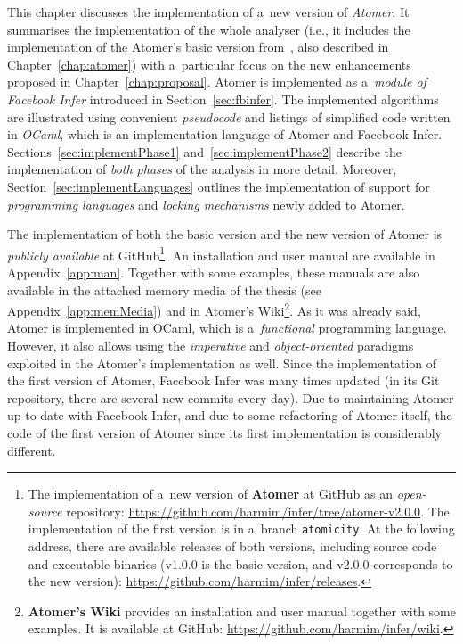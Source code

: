 This chapter discusses the implementation of a~new version of \emph{Atomer}. It summarises the implementation of the whole analyser (i.e., it includes the implementation of the Atomer's basic version from~\cite{harmimBP}, also described in Chapter~\ref{chap:atomer}) with a~particular focus on the new enhancements proposed in Chapter~\ref{chap:proposal}. Atomer is implemented as a~\emph{module of Facebook Infer} introduced in Section~\ref{sec:fbinfer}. The implemented algorithms are illustrated using convenient \emph{pseudocode} and listings of simplified code written in \emph{OCaml}, which is an implementation language of Atomer and Facebook Infer. Sections~\ref{sec:implementPhase1} and~\ref{sec:implementPhase2} describe the implementation of \emph{both phases} of the analysis in more detail. Moreover, Section~\ref{sec:implementLanguages} outlines the implementation of support for \emph{programming languages} and \emph{locking mechanisms} newly added to Atomer.

The implementation of both the basic version and the new version of Atomer is \emph{publicly available} at GitHub\footnote{The implementation of a~new version of \textbf{Atomer} at GitHub as an \emph{open-source} repository: \url{https://github.com/harmim/infer/tree/atomer-v2.0.0}. The implementation of the first version is in a~branch \texttt{atomicity}. At the following address, there are available releases of both versions, including source code and executable binaries (v1.0.0 is the basic version, and v2.0.0 corresponds to the new version): \url{https://github.com/harmim/infer/releases}.}. An installation and user manual are available in Appendix~\ref{app:man}. Together with some examples, these manuals are also available in the attached memory media of the thesis (see Appendix~\ref{app:memMedia}) and in Atomer's Wiki\footnote{\textbf{Atomer's Wiki} provides an installation and user manual together with some examples. It is available at GitHub: \url{https://github.com/harmim/infer/wiki}.}. As it was already said, Atomer is implemented in OCaml, which is a~\emph{functional} programming language. However, it also allows using the \emph{imperative} and \emph{object-oriented} paradigms exploited in the Atomer's implementation as well. Since the implementation of the first version of Atomer, Facebook Infer was many times updated (in its Git repository, there are several new commits every day). Due to maintaining Atomer up-to-date with Facebook Infer, and due to some refactoring of Atomer itself, the code of the first version of Atomer since its first implementation is considerably different. 

